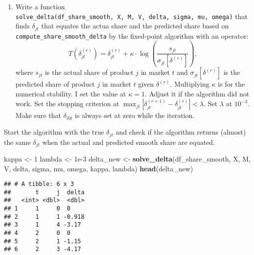 \documentclass[
]{book}
\newenvironment{Shaded}{\begin{snugshade}}{\end{snugshade}}
\newcommand{\DecValTok}[1]{\textcolor[rgb]{0.00,0.00,0.81}{#1}}
\newcommand{\FloatTok}[1]{\textcolor[rgb]{0.00,0.00,0.81}{#1}}
\newcommand{\KeywordTok}[1]{\textcolor[rgb]{0.13,0.29,0.53}{\textbf{#1}}}
\newcommand{\NormalTok}[1]{#1}
\newcommand{\OperatorTok}[1]{\textcolor[rgb]{0.81,0.36,0.00}{\textbf{#1}}}
\newcommand{\StringTok}[1]{\textcolor[rgb]{0.31,0.60,0.02}{#1}}
\providecommand{\tightlist}{%
  \setlength{\itemsep}{0pt}\setlength{\parskip}{0pt}}
\begin{document}
\begin{enumerate}
\def\labelenumi{\arabic{enumi}.}
\setcounter{enumi}{7}
\tightlist
\item
  Write a function \texttt{solve\_delta(df\_share\_smooth,\ X,\ M,\ V,\ delta,\ sigma,\ mu,\ omega)} that finds \(\delta_{jt}\) that equates the actua share and the predicted share based on \texttt{compute\_share\_smooth\_delta} by the fixed-point algorithm with an operator:
  \[
  T(\delta_{jt}^{(r)}) = \delta_{jt}^{(r)} + \kappa \cdot \log\left(\frac{s_{jt}}{\sigma_{jt}[\delta^{(r)}]}\right),
  \]
  where \(s_{jt}\) is the actual share of product \(j\) in market \(t\) and \(\sigma_{jt}[\delta^{(r)}]\) is the predicted share of product \(j\) in market \(t\) given \(\delta^{(r)}\). Multiplying \(\kappa\) is for the numerical stability. I set the value at \(\kappa = 1\). Adjust it if the algorithm did not work. Set the stopping criterion at \(\max_{jt}|\delta_{jt}^{(r + 1)} - \delta_{jt}^{(r)}| < \lambda\). Set \(\lambda\) at \(10^{-3}\). Make sure that \(\delta_{i0t}\) is always set at zero while the iteration.
\end{enumerate}

Start the algorithm with the true \(\delta_{jt}\) and check if the algorithm returns (almost) the same \(\delta_{jt}\) when the actual and predicted smooth share are equated.

\begin{Shaded}
\begin{Highlighting}[]
\NormalTok{kappa <-}\StringTok{ }\DecValTok{1}
\NormalTok{lambda <-}\StringTok{ }\FloatTok{1e-3}
\NormalTok{delta_new <-}
\StringTok{  }\KeywordTok{solve_delta}\NormalTok{(df_share_smooth, X, M, V, delta, sigma, mu, omega, kappa, lambda)}
\KeywordTok{head}\NormalTok{(delta_new)}
\end{Highlighting}
\end{Shaded}

\begin{verbatim}
## # A tibble: 6 x 3
##       t     j  delta
##   <int> <dbl>  <dbl>
## 1     1     0  0    
## 2     1     1 -0.918
## 3     1     4 -3.17 
## 4     2     0  0    
## 5     2     1 -1.15 
## 6     2     3 -4.17
\end{verbatim}

\begin{Shaded}
\end{Shaded}
\end{document}
